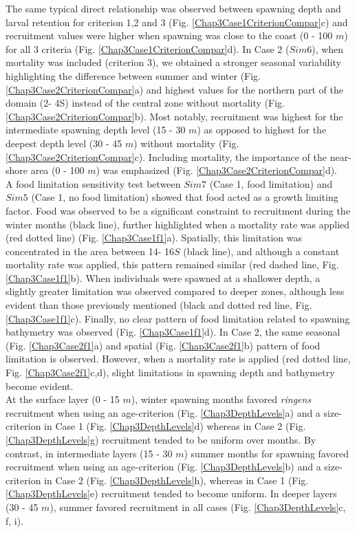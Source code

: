 The same typical direct relationship was observed between spawning depth and larval retention for criterion 1,2 and 3 (Fig. \ref{Chap3Case1CriterionCompar}c) and recruitment values were higher when spawning was close to the coast (0 - 100 $m$) for all 3 criteria (Fig. \ref{Chap3Case1CriterionCompar}d). In Case 2 ($Sim 6$), when mortality was included (criterion 3), we obtained a stronger seasonal variability highlighting the difference between summer and winter (Fig. \ref{Chap3Case2CriterionCompar}a) and highest values for the northern part of the domain (2\textdegree - 4\textdegree S) instead of the central zone without mortality (Fig. \ref{Chap3Case2CriterionCompar}b). Most notably, recruitment was highest for the intermediate spawning depth level (15 - 30 $m$) as opposed to highest for the deepest depth level (30 - 45 $m$) without mortality (Fig. \ref{Chap3Case2CriterionCompar}c). Including mortality, the importance of the near-shore area (0 - 100 $m$) was emphasized (Fig. \ref{Chap3Case2CriterionCompar}d).\\

A food limitation sensitivity test between $Sim 7$ (Case 1, food limitation) and $Sim 5$ (Case 1, no food limitation) showed that food acted as a growth limiting factor. Food was observed to be a significant constraint to recruitment during the winter months (black line), further highlighted when a mortality rate was applied (red dotted line) (Fig. \ref{Chap3Case1f1}a). Spatially, this limitation was concentrated in the area between 14\textdegree - 16\textdegree $S$ (black line), and although a constant mortality rate was applied, this pattern remained similar (red dashed line, Fig. \ref{Chap3Case1f1}b). When individuals were spawned at a shallower depth, a slightly greater limitation was observed compared to deeper zones, although less evident than those previously mentioned (black and dotted red line, Fig. \ref{Chap3Case1f1}c). Finally, no clear pattern of food limitation related to spawning bathymetry was observed (Fig. \ref{Chap3Case1f1}d). In Case 2, the same seasonal (Fig. \ref{Chap3Case2f1}a) and spatial (Fig. \ref{Chap3Case2f1}b) pattern of food limitation is observed. However, when a mortality rate is applied (red dotted line, Fig. \ref{Chap3Case2f1}c,d), slight limitations in spawning depth and bathymetry become evident.\\

At the surface layer (0 - 15 $m$), winter spawning months favored \textit{\gls{ringens}} recruitment when using an age-criterion (Fig. \ref{Chap3DepthLevels}a) and a size-criterion in Case 1 (Fig. \ref{Chap3DepthLevels}d) whereas in Case 2 (Fig. \ref{Chap3DepthLevels}g) recruitment tended to be uniform over months. By contrast, in intermediate layers (15 - 30 $m$) summer months for spawning favored recruitment when using an age-criterion (Fig. \ref{Chap3DepthLevels}b) and a size-criterion in Case 2 (Fig. \ref{Chap3DepthLevels}h), whereas in Case 1 (Fig. \ref{Chap3DepthLevels}e) recruitment tended to become uniform. In deeper layers (30 - 45 $m$), summer favored recruitment in all cases (Fig. \ref{Chap3DepthLevels}c, f, i).\\

